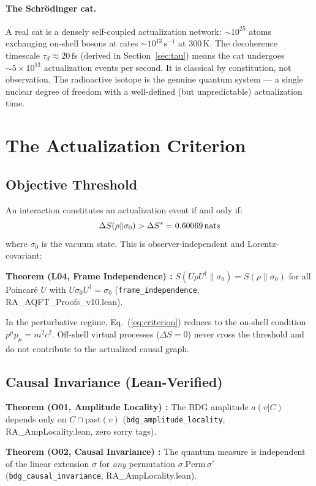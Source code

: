 \documentclass[12pt,a4paper]{article}
\begin{document}
\paragraph{The Schr\"odinger cat.} A real cat is a densely self-coupled actualization network: $\sim10^{25}$ atoms exchanging on-shell bosons at rates $\sim10^{13}\,\mathrm{s}^{-1}$ at $300\,\mathrm{K}$.  The decoherence timescale $\tau_d \approx 20\,\mathrm{fs}$ (derived in Section~\ref{sec:tau}) means the cat undergoes $\sim5\times10^{13}$ actualization events per second.  It is classical by constitution, not observation.  The radioactive isotope is the genuine quantum system — a single nuclear degree of freedom with a well-defined (but unpredictable) actualization time.

\section{The Actualization Criterion}

\subsection{Objective Threshold}

An interaction constitutes an actualization event if and only if:
\begin{equation}
  \Delta S(\rho \| \sigma_0) > \Delta S^* = 0.60069\,\mathrm{nats}
  \label{eq:criterion}
\end{equation}
where $\sigma_0$ is the vacuum state.  This is observer-independent and Lorentz-covariant:
\begin{leanbox}
\textbf{Theorem (L04, Frame Independence) \statusLV:} $S(U\rho U^\dagger \| \sigma_0) = S(\rho\|\sigma_0)$ for all Poincar\'e $U$ with $U\sigma_0 U^\dagger = \sigma_0$ (\texttt{frame\_independence}, RA\_AQFT\_Proofs\_v10.lean).
\end{leanbox}
In the perturbative regime, Eq.~(\ref{eq:criterion}) reduces to the on-shell condition $p^\mu p_\mu = m^2c^2$.  Off-shell virtual processes ($\Delta S = 0$) never cross the threshold and do not contribute to the actualized causal graph.

\subsection{Causal Invariance (Lean-Verified)}

\begin{leanbox}
\textbf{Theorem (O01, Amplitude Locality) \statusLV:} The BDG amplitude $a(v|C)$ depends only on $C \cap \mathrm{past}(v)$ (\texttt{bdg\_amplitude\_locality}, RA\_AmpLocality.lean, zero sorry tags).

\textbf{Theorem (O02, Causal Invariance) \statusLV:} The quantum measure is independent of the linear extension $\sigma$ for \emph{any} permutation $\sigma.\mathrm{Perm}\,\sigma'$ (\texttt{bdg\_causal\_invariance}, RA\_AmpLocality.lean).
\end{leanbox}
\end{document}
